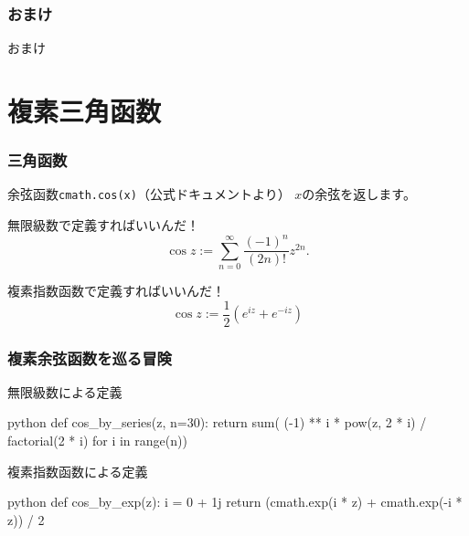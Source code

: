 \documentclass[dvipdfmx,11pt,notheorems]{beamer}
\theoremstyle{definition}
\begin{document}
\appendix

\setcounter{finalframe}{\value{framenumber}}

\begin{frame}[fragile]\frametitle{おまけ}
\begin{center}
\Huge{おまけ}
\end{center}
\end{frame}

\section{複素三角函数}

\begin{frame}\frametitle{三角函数}

\begin{block}{余弦函数\texttt{cmath.cos(x)}（公式ドキュメントより）}
$x$の余弦を返します。
\end{block}

\begin{block}{無限級数で定義すればいいんだ！}
\begin{equation*}
\cos{z} := \sum^{\infty}_{n=0}\frac{(-1)^{n}}{(2n)!}z^{2n}.
\end{equation*}
\end{block}

\begin{block}{複素指数函数で定義すればいいんだ！}
\begin{equation*}
\cos{z} := \frac{1}{2}\left(e^{iz} + e^{-iz} \right) 
\end{equation*}
\end{block}

\end{frame}

\begin{frame}[fragile]\frametitle{複素余弦函数を巡る冒険}

\begin{exampleblock}{無限級数による定義}
\begin{pygments}{python}
def cos_by_series(z, n=30):
    return sum(
        (-1) ** i * pow(z, 2 * i) / factorial(2 * i) 
        for i in range(n))
\end{pygments}
\end{exampleblock}

\begin{exampleblock}{複素指数函数による定義}
\begin{pygments}{python}
def cos_by_exp(z):
    i = 0 + 1j
    return (cmath.exp(i * z) + cmath.exp(-i * z)) / 2
\end{pygments}
\end{exampleblock}

\end{frame}
\end{document}
